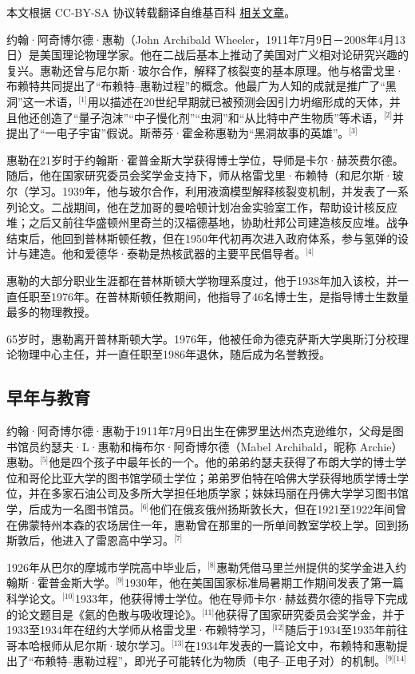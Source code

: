 
本文根据 CC-BY-SA 协议转载翻译自维基百科 \href{https://en.wikipedia.org/wiki/John_Archibald_Wheeler}{相关文章}。

约翰·阿奇博尔德·惠勒（John Archibald Wheeler，1911年7月9日－2008年4月13日）是美国理论物理学家。他在二战后基本上推动了美国对广义相对论研究兴趣的复兴。惠勒还曾与尼尔斯·玻尔合作，解释了核裂变的基本原理。他与格雷戈里·布赖特共同提出了“布赖特–惠勒过程”的概念。他最广为人知的成就是推广了“黑洞”这一术语，\(^\text{[1]}\)用以描述在20世纪早期就已被预测会因引力坍缩形成的天体，并且他还创造了“量子泡沫”“中子慢化剂”“虫洞”和“从比特中产生物质”等术语，\(^\text{[2]}\)并提出了“一电子宇宙”假说。斯蒂芬·霍金称惠勒为“黑洞故事的英雄”。\(^\text{[3]}\)

惠勒在21岁时于约翰斯·霍普金斯大学获得博士学位，导师是卡尔·赫茨费尔德。随后，他在国家研究委员会奖学金支持下，师从格雷戈里·布赖特（和尼尔斯·玻尔（学习。1939年，他与玻尔合作，利用液滴模型解释核裂变机制，并发表了一系列论文。二战期间，他在芝加哥的曼哈顿计划冶金实验室工作，帮助设计核反应堆；之后又前往华盛顿州里奇兰的汉福德基地，协助杜邦公司建造核反应堆。战争结束后，他回到普林斯顿任教，但在1950年代初再次进入政府体系，参与氢弹的设计与建造。他和爱德华·泰勒是热核武器的主要平民倡导者。\(^\text{[4]}\)

惠勒的大部分职业生涯都在普林斯顿大学物理系度过，他于1938年加入该校，并一直任职至1976年。在普林斯顿任教期间，他指导了46名博士生，是指导博士生数量最多的物理教授。

65岁时，惠勒离开普林斯顿大学。1976年，他被任命为德克萨斯大学奥斯汀分校理论物理中心主任，并一直任职至1986年退休，随后成为名誉教授。
\subsection{早年与教育}
约翰·阿奇博尔德·惠勒于1911年7月9日出生在佛罗里达州杰克逊维尔，父母是图书馆员约瑟夫·L·惠勒和梅布尔·阿奇博尔德（Mabel Archibald，昵称 Archie）惠勒。\(^\text{[5]}\)他是四个孩子中最年长的一个。他的弟弟约瑟夫获得了布朗大学的博士学位和哥伦比亚大学的图书馆学硕士学位；弟弟罗伯特在哈佛大学获得地质学博士学位，并在多家石油公司及多所大学担任地质学家；妹妹玛丽在丹佛大学学习图书馆学，后成为一名图书馆员。\(^\text{[6]}\)他们在俄亥俄州扬斯敦长大，但在1921至1922年间曾在佛蒙特州本森的农场居住一年，惠勒曾在那里的一所单间教室学校上学。回到扬斯敦后，他进入了雷恩高中学习。\(^\text{[7]}\)

1926年从巴尔的摩城市学院高中毕业后，\(^\text{[8]}\)惠勒凭借马里兰州提供的奖学金进入约翰斯·霍普金斯大学。\(^\text{[9]}\)1930年，他在美国国家标准局暑期工作期间发表了第一篇科学论文。\(^\text{[10]}\)1933年，他获得博士学位。他在导师卡尔·赫兹费尔德的指导下完成的论文题目是《氦的色散与吸收理论》。\(^\text{[11]}\)他获得了国家研究委员会奖学金，并于1933至1934年在纽约大学师从格雷戈里·布赖特学习，\(^\text{[12]}\)随后于1934至1935年前往哥本哈根师从尼尔斯·玻尔学习。\(^\text{[13]}\)在1934年发表的一篇论文中，布赖特和惠勒提出了“布赖特–惠勒过程”，即光子可能转化为物质（电子–正电子对）的机制。\(^\text{[9][14]}\)
